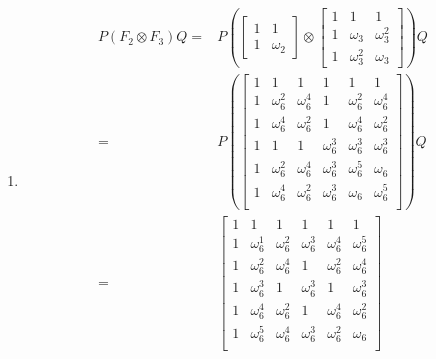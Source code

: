 \documentclass{assignment}
\begin{document}
\begin{problemlist}
  \clearpage
  \pbitem
  \begin{problem}
  \end{problem}
  \begin{answer}
    \\
    \begin{enumerate}
    \item
      \begin{align*}
        P(F_2\otimes F_3)Q
        =&P(
        \begin{bmatrix}
          1 & 1\\
          1 & \omega_2
        \end{bmatrix}
        \otimes
        \begin{bmatrix}
          1 & 1 & 1\\
          1 & \omega_3 & \omega_3^2\\
          1 & \omega_3^2 & \omega_3
        \end{bmatrix}
        )Q\\
        =&P(
        \begin{bmatrix}
          1 & 1 & 1 & 1 & 1 & 1\\
          1 & \omega_6^2 & \omega_6^4 & 1 & \omega_6^2 & \omega_6^4\\
          1 & \omega_6^4 & \omega_6^2 & 1 & \omega_6^4 & \omega_6^2\\
          1 & 1 & 1 & \omega_6^3 & \omega_6^3 & \omega_6^3\\
          1 & \omega_6^2 & \omega_6^4 & \omega_6^3 & \omega_6^5 & \omega_6\\
          1 & \omega_6^4 & \omega_6^2 & \omega_6^3 & \omega_6 & \omega_6^5\\
        \end{bmatrix}
        )Q\\
        =&
        \begin{bmatrix}
          1 & 1 & 1 & 1 & 1 & 1\\
          1 & \omega_6^1 & \omega_6^2 & \omega_6^3 & \omega_6^4 & \omega_6^5\\
          1 & \omega_6^2 & \omega_6^4 & 1 & \omega_6^2 & \omega_6^4\\
          1 & \omega_6^3 & 1 & \omega_6^3 & 1 & \omega_6^3\\
          1 & \omega_6^4 & \omega_6^2 & 1 & \omega_6^4 & \omega_6^2\\
          1 & \omega_6^5 & \omega_6^4 & \omega_6^3 & \omega_6^2 & \omega_6\\
        \end{bmatrix}\\

\end{align*}
\end{enumerate}
\end{answer}
\end{problemlist}
\end{document}
